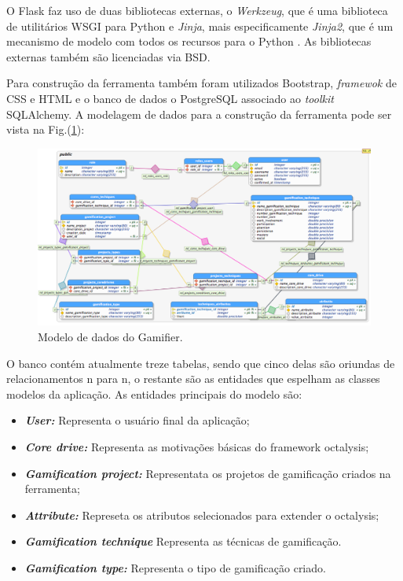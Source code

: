 O Flask faz uso de duas bibliotecas externas, o \textit{Werkzeug}, que é uma biblioteca de utilitários WSGI para Python \cite{werkzeug} e \textit{Jinja}, mais especificamente \textit{Jinja2}, que é um mecanismo de modelo com todos os recursos para o Python \cite{jinja2}. As bibliotecas externas também são licenciadas via BSD.

Para construção da ferramenta também foram utilizados Bootstrap, \textit{framewok} de CSS e HTML e o banco de dados o PostgreSQL associado ao \textit{toolkit} SQLAlchemy. A modelagem de dados para a construção da ferramenta pode ser vista na Fig.(\ref{fig06}):

\begin{figure}[h]
	\centering
		\includegraphics[keepaspectratio=true,scale=0.4]{figuras/gamifierdados.png}
	\caption{Modelo de dados do Gamifier.\label{fig06}}
\end{figure}

O banco contém atualmente treze tabelas, sendo que cinco delas são oriundas de relacionamentos n para n, o restante são as entidades que espelham as classes modelos da aplicação. 
As entidades principais do modelo são:

\begin{itemize}
\item  \textbf \textit{User:} Representa o usuário final da aplicação;
\item  \textbf \textit{Core drive:} Representa as motivações básicas do framework octalysis;
\item  \textbf \textit{Gamification project:} Representata os projetos de gamificação criados na ferramenta;
\item  \textbf \textit{Attribute:} Represeta os atributos selecionados para extender o octalysis;
\item  \textbf \textit{Gamification technique} Representa as técnicas de gamificação.
\item  \textbf \textit{Gamification type:} Representa o tipo de gamificação criado.
\end{itemize}


